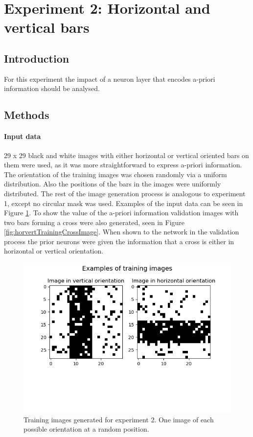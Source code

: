 \section{Experiment 2: Horizontal and vertical bars}
\label{section:horvert}



 \subsection{Introduction}

For this experiment the impact of a neuron layer that encodes a-priori information should be analysed.

\subsection{Methods}

\paragraph{Input data}
29 x 29 black and white images with either horizontal or vertical oriented bars on them were used, as it was more straightforward to express a-priori information. The orientation of the training images was chosen randomly via a uniform distribution. Also the positions of the bars in the images were uniformly distributed. The rest of the image generation process is analogous to experiment 1, except no circular mask was used. Examples of the input data can be seen in Figure \ref{fig:horvertImages}. To show the value of the a-priori information validation images with two bars forming a cross were also generated, seen in Figure \ref{fig:horvertTrainingCrossImage}. When shown to the network in the validation process the prior neurons were given the information that a cross is either in horizontal or vertical orientation.

\begin{figure}
  \includegraphics[width=\linewidth]{figures/horvert/horvertTrainingImages.png}
  \caption{Training images generated for experiment 2. One image of each possible orientation at a random position.}
  \label{fig:horvertImages}
\end{figure}


